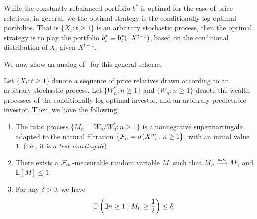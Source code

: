     While the constantly rebalanced portfolio $b^*$ is optimal for the case  of \iid price relatives,  in general, we the optimal strategy is the conditionally  log-optimal portfolios. That is $\{X_t: t \geq 1\}$ is an arbitrary stochastic process, then the optimal strategy is to play the portfolio $\boldsymbol{b}^*_t \equiv \boldsymbol{b}^*_t(\cdot | X^{t-1})$, based on the conditional distribution of $X_t$ given $X^{t-1}$. 

    We now show an analog of~ for this general scheme. 
    \begin{proposition}
        \label{prop:ratio-of-wealth-supermartingale} Let $\{X_t: t \geq 1\}$ denote a sequence of price relatives drawn according to an arbitrary stochastic process. Let $\{W_n^*: n \geq 1\}$ and $\{W_n: n \geq 1\}$ denote the wealth processes of the conditionally log-optimal investor, and an arbitrary predictable investor. Then, we have the following: 
        \begin{enumerate}[label=(\alph*)]
            \item The ratio process $\{M_n = W_n/W_n^*: n \geq 1\}$ is a nonnegative supermartingale adapted to the natural filtration $\{ \mathcal{F}_n = \sigma(X^n): n \geq 1\}$, with an initial value $1$. (i.e., it is a \emph{test martingale})
            \item There exists a $\mathcal{F}_{\infty}$-measurable random variable $M$, such that $M_n \stackrel{a.s.}{\longrightarrow} M$, and $\mathbb{E}[M]\leq 1$. 
            \item For any $\delta > 0$, we have 
            \begin{align}
                \mathbb{P}\left( \exists n \geq 1: M_n \geq \frac{1}{\delta} \right) \leq \delta. 
            \end{align}
        \end{enumerate}
    \end{proposition}
